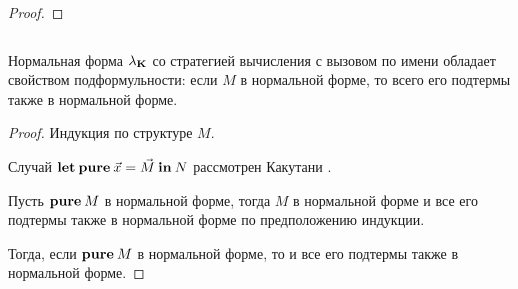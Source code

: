\begin{proof}
\end{proof}

\begin{theorem}
$ $

Нормальная форма $\lambda_{{\bf K}}$ со стратегией вычисления с вызовом по имени обладает свойством подформульности: если $M$ в нормальной форме, то всего его подтермы также в нормальной форме.

\end{theorem}

\begin{proof}
Индукция по структуре $M$.

Случай ${\bf let \: pure\:} \vec{x} = \vec{M} {\: \bf in \:} N$ рассмотрен Какутани \cite{ModalK} \cite{ModalK1}.

Пусть ${\bf pure \:} M$ в нормальной форме, тогда $M$ в нормальной форме и все его подтермы также в нормальной форме по предположению индукции.

Тогда, если ${\bf pure \:} M$ в нормальной форме, то и все его подтермы также в нормальной форме.
\end{proof}
